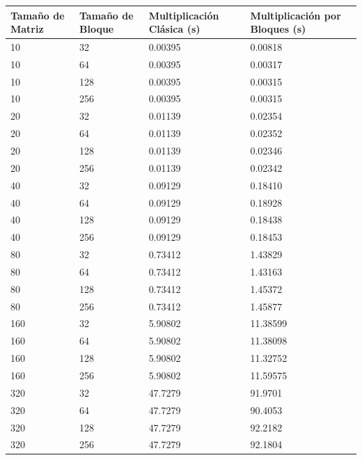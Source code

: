 \documentclass[conference]{IEEEtran}
\begin{document}
    \begin{table}[h!]
        \centering
        \begin{tabularx}{220pt}{|X|X|X|X|}
        \hline
        \textbf{Tamaño de Matriz} & \textbf{Tamaño de Bloque} & \textbf{Multiplicación Clásica (s)} & \textbf{Multiplicación por Bloques (s)} \\ \hline
        10   & 32  & 0.00395    & 0.00818    \\ \hline
        10   & 64  & 0.00395    & 0.00317    \\ \hline
        10   & 128 & 0.00395    & 0.00315    \\ \hline
        10   & 256 & 0.00395    & 0.00315    \\ \hline
        20   & 32  & 0.01139    & 0.02354    \\ \hline
        20   & 64  & 0.01139    & 0.02352    \\ \hline
        20   & 128 & 0.01139    & 0.02346    \\ \hline
        20   & 256 & 0.01139    & 0.02342    \\ \hline
        40   & 32  & 0.09129    & 0.18410    \\ \hline
        40   & 64  & 0.09129    & 0.18928    \\ \hline
        40   & 128 & 0.09129    & 0.18438    \\ \hline
        40   & 256 & 0.09129    & 0.18453    \\ \hline
        80   & 32  & 0.73412    & 1.43829    \\ \hline
        80   & 64  & 0.73412    & 1.43163    \\ \hline
        80   & 128 & 0.73412    & 1.45372    \\ \hline
        80   & 256 & 0.73412    & 1.45877    \\ \hline
        160  & 32  & 5.90802    & 11.38599   \\ \hline
        160  & 64  & 5.90802    & 11.38098   \\ \hline
        160  & 128 & 5.90802    & 11.32752   \\ \hline
        160  & 256 & 5.90802    & 11.59575   \\ \hline
        320  & 32  & 47.7279    & 91.9701    \\ \hline
        320  & 64  & 47.7279    & 90.4053    \\ \hline
        320  & 128 & 47.7279    & 92.2182    \\ \hline
        320  & 256 & 47.7279    & 92.1804    \\ \hline

\end{tabularx}
\end{table}
\end{document}
